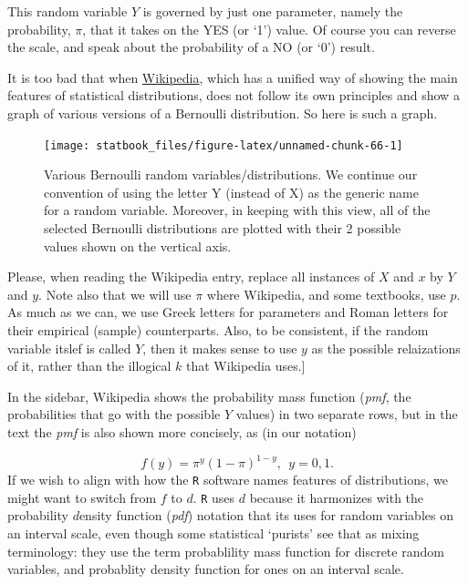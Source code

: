 \documentclass[]{book}
\begin{document}
This random variable \(Y\) is governed by just one parameter, namely the probability, \(\pi\), that it takes on the YES (or `1') value. Of course you can reverse the scale, and speak about the probability of a NO (or `0') result.

It is too bad that when \href{https://en.wikipedia.org/wiki/Bernoulli_distribution}{Wikipedia}, which has a unified way of showing the main features of statistical distributions, does not follow its own principles and show a graph of various versions of a Bernoulli distribution. So here is such a graph.

\begin{figure}

\texttt{[image: statbook\_files/figure-latex/unnamed-chunk-66-1]} \hfill{}

\caption{Various Bernoulli random variables/distributions. We continue our convention of using the letter Y (instead of X) as the generic name for a random variable. Moreover, in keeping with this view, all of the selected Bernoulli distributions are plotted with their 2 possible values shown on the vertical axis.}\label{fig:unnamed-chunk-66}
\end{figure}

Please, when reading the Wikipedia entry, replace all instances of \(X\) and \(x\) by \(Y\) and \(y\). Note also that we will use \(\pi\) where Wikipedia, and some textbooks, use \(p\). As much as we can, we use Greek letters for parameters and Roman letters for their empirical (sample) counterparts. Also, to be consistent, if the random variable itslef is called \(Y\), then it makes sense to use \(y\) as the possible relaizations of it, rather than the illogical \(k\) that Wikipedia uses.{]}

In the sidebar, Wikipedia shows the probability mass function (\emph{pmf}, the probabilities that go with the possible \(Y\) values) in two separate rows, but in the text the \emph{pmf} is also shown more concisely, as (in our notation)

\[f(y) = \pi^y (1-\pi)^{1-y}, \ \ y = 0, 1.\]
If we wish to align with how the \texttt{R} software names features of distributions, we might want to switch from \(f\) to \(d\). \texttt{R} uses \(d\) because it harmonizes with the probability \(d\)ensity function (\emph{pdf}) notation that its uses for random variables on an interval scale, even though some statistical `purists' see that as mixing terminology: they use the term probablility mass function for discrete random variables, and probablity density function for ones on an interval scale.
\end{document}
